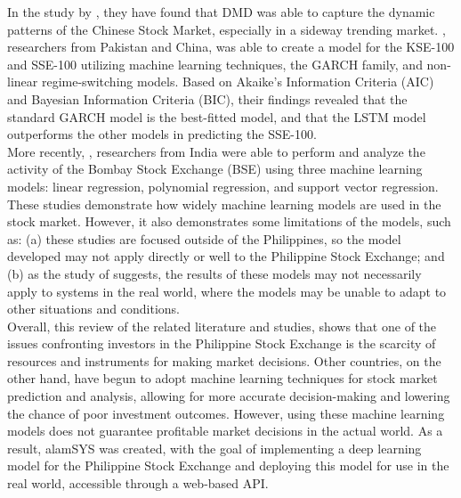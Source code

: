 In the study by , they have found that DMD was able to capture the 
dynamic patterns of the Chinese Stock Market, especially in a sideway trending market.
, researchers from Pakistan and China, was able to 
create a model for the KSE-100 and SSE-100 utilizing machine learning techniques, the GARCH 
family, and non-linear regime-switching models. Based on Akaike's Information Criteria (AIC) 
and Bayesian Information Criteria (BIC), their findings revealed that the standard GARCH model 
is the best-fitted model, and that the LSTM model outperforms the other models in predicting 
the SSE-100.
\\

More recently, , researchers from India were able 
to perform and analyze the activity of the Bombay Stock Exchange (BSE) using three machine learning models: 
linear regression, polynomial regression, and support vector regression.
\\

These studies demonstrate how widely machine learning models are used in the stock market. 
However, it also demonstrates some limitations of the models, such as: (a) these studies 
are focused outside of the Philippines, so the model developed may not apply directly or 
well to the Philippine Stock Exchange; and (b) as the study of  suggests, the results 
of these models may not necessarily apply to systems in the real world, where the models 
may be unable to adapt to other situations and conditions.
\\


Overall, this review of the related literature and studies, shows that one of the issues 
confronting investors in the Philippine Stock Exchange is the scarcity of resources and 
instruments for making market decisions. Other countries, on the other hand, have begun to 
adopt machine learning techniques for stock market prediction and analysis, allowing for 
more accurate decision-making and lowering the chance of poor investment outcomes. 
However, using these machine learning models does not guarantee profitable market decisions in 
the actual world. As a result, alamSYS was created, with the goal of implementing a deep 
learning model for the Philippine Stock Exchange and deploying this model for use in the 
real world, accessible through a web-based API.
\\
